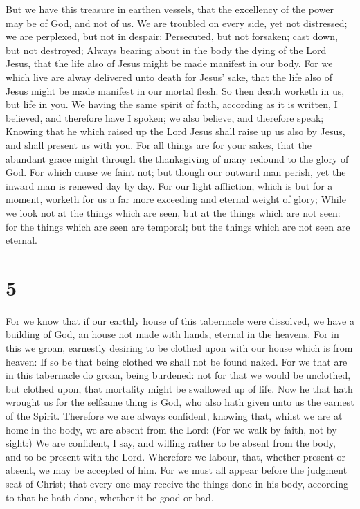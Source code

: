  But we have this treasure in earthen vessels, that the
excellency of the power may be of God, and not of us.  We
are troubled on every side, yet not distressed; we are perplexed, but
not in despair;  Persecuted, but not forsaken; cast down,
but not destroyed;  Always bearing about in the body the
dying of the Lord Jesus, that the life also of Jesus might be made
manifest in our body.  For we which live are alway
delivered unto death for Jesus' sake, that the life also of Jesus might
be made manifest in our mortal flesh.  So then death
worketh in us, but life in you.  We having the same spirit
of faith, according as it is written, I believed, and therefore have I
spoken; we also believe, and therefore speak;  Knowing that
he which raised up the Lord Jesus shall raise up us also by Jesus, and
shall present us with you.  For all things are for your
sakes, that the abundant grace might through the thanksgiving of many
redound to the glory of God.  For which cause we faint not;
but though our outward man perish, yet the inward man is renewed day by
day.  For our light affliction, which is but for a moment,
worketh for us a far more exceeding and eternal weight of glory;
 While we look not at the things which are seen, but at the
things which are not seen: for the things which are seen are temporal;
but the things which are not seen are eternal.

\hypertarget{section-4}{%
\section{5}\label{section-4}}

 For we know that if our earthly house of this tabernacle
were dissolved, we have a building of God, an house not made with hands,
eternal in the heavens.  For in this we groan, earnestly
desiring to be clothed upon with our house which is from heaven:
 If so be that being clothed we shall not be found naked.
 For we that are in this tabernacle do groan, being
burdened: not for that we would be unclothed, but clothed upon, that
mortality might be swallowed up of life.  Now he that hath
wrought us for the selfsame thing is God, who also hath given unto us
the earnest of the Spirit.  Therefore we are always
confident, knowing that, whilst we are at home in the body, we are
absent from the Lord:  (For we walk by faith, not by sight:)
 We are confident, I say, and willing rather to be absent
from the body, and to be present with the Lord.  Wherefore
we labour, that, whether present or absent, we may be accepted of him.
 For we must all appear before the judgment seat of Christ;
that every one may receive the things done in his body, according to
that he hath done, whether it be good or bad.

